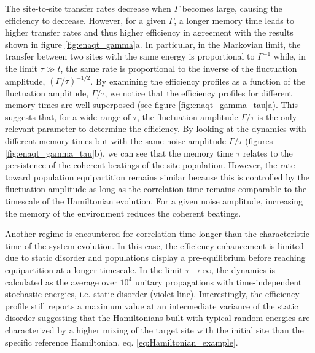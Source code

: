 \documentclass[12pt, amsmath, amssymb, graphicx]{iopart}
\begin{document}
%
The site-to-site transfer rates decrease when $\Gamma$ becomes large, causing the efficiency to decrease.
However, for a given $\Gamma$, a longer memory time leads to higher transfer rates and thus higher efficiency in agreement with the results shown in figure \ref{fig:enaqt_gamma}a.
In particular, in the Markovian limit, the transfer between two sites with the same energy is proportional to $\Gamma^{-1}$ while, in the limit $\tau \gg t$, the same rate is proportional to the inverse of the fluctuation amplitude, $\left( \Gamma/\tau \right)^{-1/2}$.
By examining the efficiency profiles as a function of the fluctuation amplitude, $\Gamma/\tau$, we notice that the efficiency profiles for different memory times are well-superposed (see figure \ref{fig:enaqt_gamma_tau}a).
This suggests that, for a wide range of $\tau$, the fluctuation amplitude $\Gamma/\tau$ is the only relevant parameter to determine the efficiency.
By looking at the dynamics with different memory times but with the same noise amplitude $\Gamma/\tau$ (figures \ref{fig:enaqt_gamma_tau}b), we can see that the memory time $\tau$ relates to the persistence of the coherent beatings of the site population.
However, the rate toward population equipartition remains similar because this is controlled by the fluctuation amplitude as long as the correlation time remains comparable to the timescale of the Hamiltonian evolution.
For a given noise amplitude, increasing the memory of the environment reduces the coherent beatings.

Another regime is encountered for correlation time longer than the characteristic time of the system evolution. In this case, the efficiency enhancement is limited due to static disorder and populations display a pre-equilibrium before reaching equipartition at a longer timescale. In the limit $\tau \to \infty$, the dynamics is calculated as the average over $10^4$ unitary propagations with time-independent stochastic energies, i.e. static disorder (violet line). Interestingly, the efficiency profile still reports a maximum value at an intermediate variance of the static disorder suggesting that the Hamiltonians built with typical random energies are characterized by a higher mixing of the target site with the initial site than the specific reference Hamiltonian, eq. \ref{eq:Hamiltonian_example}.
\end{document}
